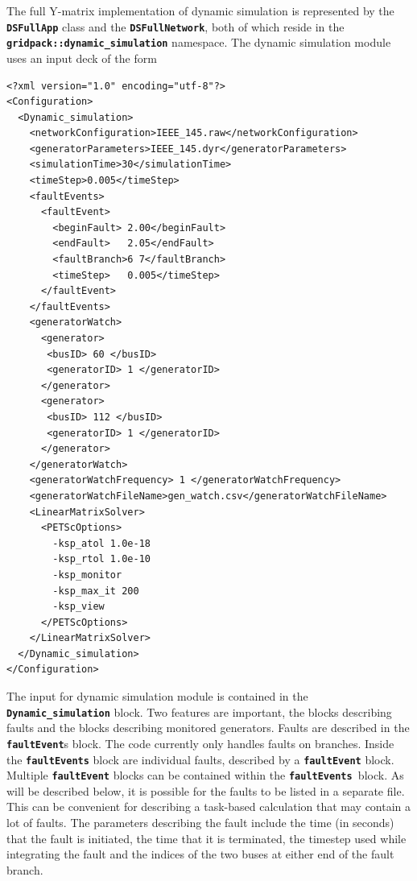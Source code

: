 \documentclass[12pt]{report} %
\begin{document}
The full Y-matrix implementation of dynamic simulation is represented by the \texttt{\textbf{DSFullApp}} class and the \texttt{\textbf{DSFullNetwork}}, both of which reside in the \texttt{\textbf{gridpack::dynamic\_simulation}} namespace.
The dynamic simulation module uses an input deck of the form
{
\color{blue}
\begin{Verbatim}[fontseries=b]
<?xml version="1.0" encoding="utf-8"?>
<Configuration>
  <Dynamic_simulation>
    <networkConfiguration>IEEE_145.raw</networkConfiguration>
    <generatorParameters>IEEE_145.dyr</generatorParameters>
    <simulationTime>30</simulationTime>
    <timeStep>0.005</timeStep>
    <faultEvents>
      <faultEvent>
        <beginFault> 2.00</beginFault>
        <endFault>   2.05</endFault>
        <faultBranch>6 7</faultBranch>
        <timeStep>   0.005</timeStep>
      </faultEvent>
    </faultEvents>
    <generatorWatch>
      <generator>
       <busID> 60 </busID>
       <generatorID> 1 </generatorID>
      </generator>
      <generator>
       <busID> 112 </busID>
       <generatorID> 1 </generatorID>
      </generator>
    </generatorWatch>
    <generatorWatchFrequency> 1 </generatorWatchFrequency>
    <generatorWatchFileName>gen_watch.csv</generatorWatchFileName>
    <LinearMatrixSolver>
      <PETScOptions>
        -ksp_atol 1.0e-18
        -ksp_rtol 1.0e-10
        -ksp_monitor
        -ksp_max_it 200
        -ksp_view
      </PETScOptions>
    </LinearMatrixSolver>
  </Dynamic_simulation>
</Configuration>
\end{Verbatim}
}

The input for dynamic simulation module is contained in the \texttt{\textbf{Dynamic\_simulation}} block. Two features are important, the blocks describing faults and the blocks describing monitored generators. Faults are described in the \texttt{\textbf{faultEvent}}s block. The code currently only handles faults on branches. Inside the \texttt{\textbf{faultEvents}} block are individual faults, described by a \texttt{\textbf{faultEvent}} block. Multiple \texttt{\textbf{faultEvent}} blocks can be contained within the \texttt{\textbf{faultEvents }}block. As will be described below, it is possible for the faults to be listed in a separate file. This can be convenient for describing a task-based calculation that may contain a lot of faults. The parameters describing the fault include the time (in seconds) that the fault is initiated, the time that it is terminated, the timestep used while integrating the fault and the indices of the two buses at either end of the fault branch.
\end{document}
